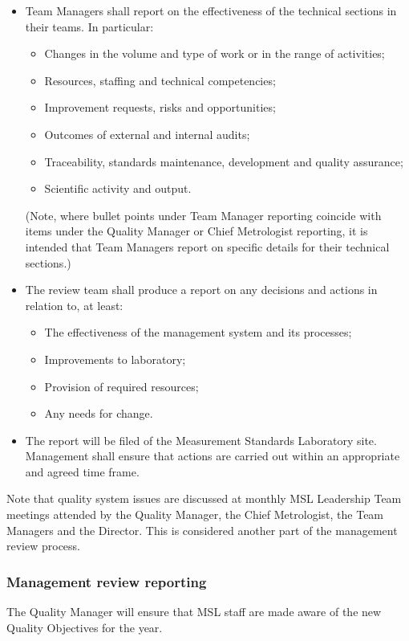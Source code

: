 \begin{itemize}
\item Team Managers shall report on the effectiveness of the technical sections in their teams. In particular: 
\begin{itemize}
\item Changes in the volume and type of work or in the range of activities;
\item Resources, staffing and technical competencies;
\item Improvement requests, risks and opportunities;
\item Outcomes of external and internal audits;
\item Traceability, standards maintenance, development and quality assurance;
\item Scientific activity and output.
\end{itemize}
(Note, where bullet points under Team Manager reporting coincide with items under the Quality Manager or Chief Metrologist reporting, it is intended that Team Managers report on specific details for their technical sections.) 
\item The review team shall produce a report on any decisions and actions in relation to, at least:
\begin{itemize}
\item The effectiveness of the management system and its processes;
\item Improvements to laboratory;
\item Provision of required resources;
\item Any needs for change.
\end{itemize}
\item The report will be filed  of the Measurement Standards Laboratory site. Management shall ensure that actions are carried out within an appropriate and agreed time frame.
\end{itemize}

Note that quality system issues are discussed at monthly MSL Leadership Team meetings attended by the Quality Manager, the Chief Metrologist, the Team Managers and the Director. This is considered another part of the management review process.
\subsubsection{Management review reporting}
The Quality Manager will ensure that MSL staff are made aware of the new Quality Objectives for the year.